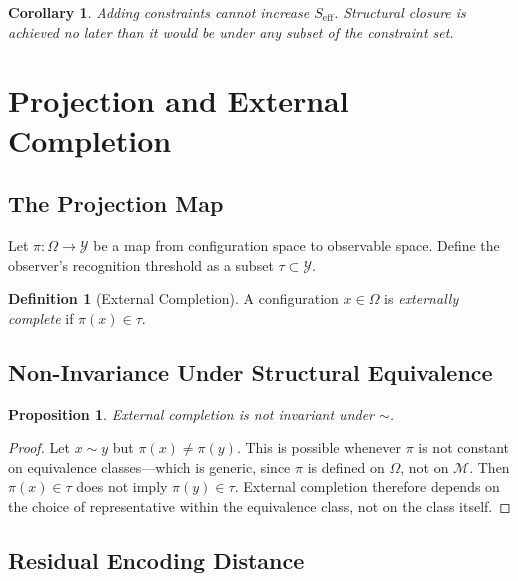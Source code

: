\documentclass[12pt, twoside]{article}
\theoremstyle{plain}
\newtheorem{proposition}[theorem]{Proposition}
\newtheorem{corollary}[theorem]{Corollary}
\theoremstyle{definition}
\newtheorem{definition}[theorem]{Definition}
\theoremstyle{remark}
\newcommand{\Seff}{S_{\text{eff}}}
\begin{document}
\begin{corollary}
Adding constraints cannot increase $\Seff$. Structural closure is achieved no later than it would be under any subset of the constraint set.
\end{corollary}

\section{Projection and External Completion}
\label{app:projection}

\subsection{The Projection Map}

Let $\pi : \Omega \to \mathcal{Y}$ be a map from configuration space to observable space. Define the observer's recognition threshold as a subset $\tau \subset \mathcal{Y}$.

\begin{definition}[External Completion]
A configuration $x \in \Omega$ is \emph{externally complete} if $\pi(x) \in \tau$.
\end{definition}

\subsection{Non-Invariance Under Structural Equivalence}

\begin{proposition}
External completion is not invariant under $\sim$.
\end{proposition}

\begin{proof}
Let $x \sim y$ but $\pi(x) \neq \pi(y)$. This is possible whenever $\pi$ is not constant on equivalence classes---which is generic, since $\pi$ is defined on $\Omega$, not on $\mathcal{M}$. Then $\pi(x) \in \tau$ does not imply $\pi(y) \in \tau$. External completion therefore depends on the choice of representative within the equivalence class, not on the class itself.
\end{proof}

\subsection{Residual Encoding Distance}
\end{document}
